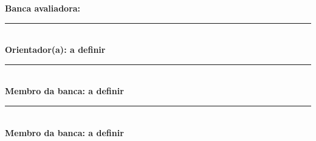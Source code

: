\begin{folhadeaprovacao}
\vspace{1.5cm}
\begin{center}
    \textbf{Banca avaliadora:} \\
    \vspace{0.5cm}

    \rule{6cm}{0.4pt} \\
    \vspace{0.2cm}
    \textbf{Orientador(a): a definir} \\
    \vspace{0.8cm}

    \rule{6cm}{0.4pt} \\
    \vspace{0.2cm}
    \textbf{Membro da banca: a definir} \\
    \vspace{0.8cm}

    \rule{6cm}{0.4pt} \\
    \vspace{0.2cm}
    \textbf{Membro da banca: a definir}
\end{center}

\end{folhadeaprovacao}
